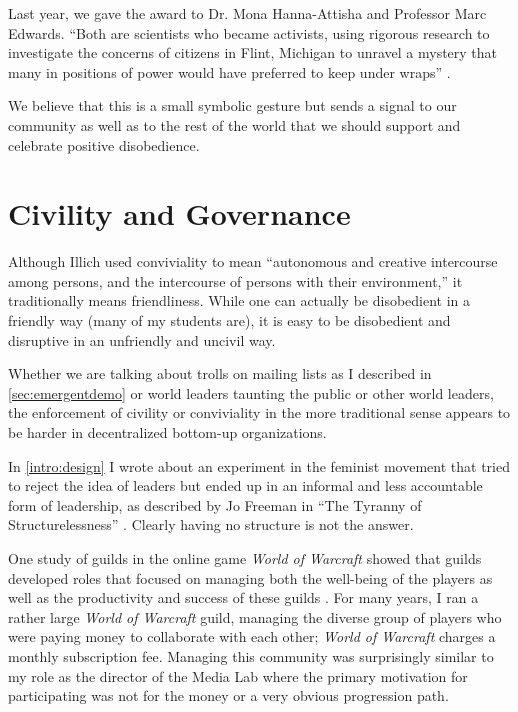 Last year, we gave the award to Dr. Mona Hanna-Attisha and Professor Marc Edwards. ``Both are scientists who became activists, using rigorous research to investigate the concerns of citizens in Flint, Michigan to unravel a mystery that many in positions of power would have preferred to keep under wraps'' \cite{disobedience2017}.

We believe that this is a small symbolic gesture but sends a signal to our community as well as to the rest of the world that we should support and celebrate positive disobedience.

\section{Civility and Governance}

Although Illich used conviviality to mean ``autonomous and creative intercourse among persons, and the intercourse of persons with their environment,'' it traditionally means friendliness. While one can actually be disobedient in a friendly way (many of my students are), it is easy to be disobedient and disruptive in an unfriendly and uncivil way.

Whether we are talking about trolls on mailing lists as I described in \autoref{sec:emergentdemo} or world leaders taunting the public or other world leaders, the enforcement of civility or conviviality in the more traditional sense appears to be harder in decentralized bottom-up organizations.

In \autoref{intro:design} I wrote about an experiment in the feminist movement that tried to reject the idea of leaders but ended up in an informal and less accountable form of leadership, as described by Jo Freeman in ``The Tyranny of Structurelessness'' \cite{freeman1972tyranny}. Clearly having no structure is not the answer.

One study of guilds in the online game \emph{World of Warcraft} showed that guilds developed roles that focused on managing both the well-being of the players as well as the productivity and success of these guilds \cite{williams2014structural}. For many years, I ran a rather large \emph{World of Warcraft} guild, managing the diverse group of players who were paying money to collaborate with each other; \emph{World of Warcraft} charges a monthly subscription fee. Managing this community was surprisingly similar to my role as the director of the Media Lab where the primary motivation for participating was not for the money or a very obvious progression path.

